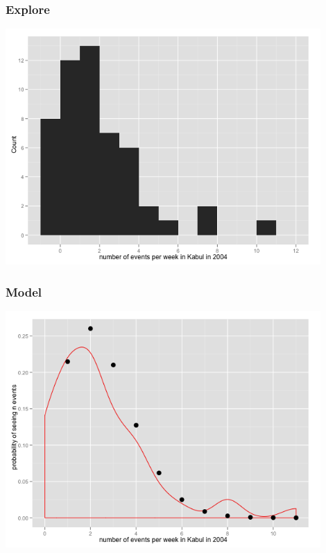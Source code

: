 \documentclass[xcolor=dvipsnames, 9pt]{beamer}
\begin{document}
\begin{frame}
    \frametitle{Explore}
    \begin{center}
    \includegraphics[width=0.9\textwidth]{histogram.png}
    \end{center}
\end{frame}

\begin{frame}
    \frametitle{Model}
    \begin{center}
    \includegraphics[width=0.9\textwidth]{density_estimate.png}
    \end{center}
\end{frame}
\end{document}
